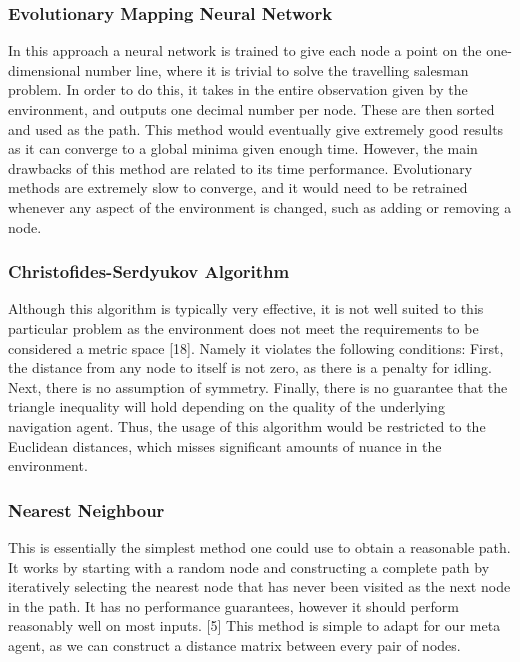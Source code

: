 \documentclass{article}
\begin{document}
	\subsubsection{Evolutionary Mapping Neural Network}
	\label{evol_nn}
	In this approach a neural network is trained to give each node a point on the one-dimensional number line, where it is trivial to solve the travelling salesman problem. In order to do this, it takes in the entire observation given by the environment, and outputs one decimal number per node. These are then sorted and used as the path. This method would eventually give extremely good results as it can converge to a global minima given enough time. However, the main drawbacks of this method are related to its time performance. Evolutionary methods are extremely slow to converge, and it would need to be retrained whenever any aspect of the environment is changed, such as adding or removing a node.
	
	\subsubsection{Christofides-Serdyukov Algorithm}
	Although this algorithm is typically very effective, it is not well suited to this particular problem as the environment does not meet the requirements to be considered a metric space [18]. Namely it violates the following conditions: First, the distance from any node to itself is not zero, as there is a penalty for idling. Next, there is no assumption of symmetry. Finally, there is no guarantee that the triangle inequality will hold depending on the quality of the underlying navigation agent. Thus, the usage of this algorithm would be restricted to the Euclidean distances, which misses significant amounts of nuance in the environment.
	
	\subsubsection{Nearest Neighbour}
	\label{nearest_neighbour}
	This is essentially the simplest method one could use to obtain a reasonable path. It works by starting with a random node and constructing a complete path by iteratively selecting the nearest node that has never been visited as the next node in the path. It has no performance guarantees, however it should perform reasonably well on most inputs. [5] This method is simple to adapt for our meta agent, as we can construct a distance matrix between every pair of nodes.
	
\end{document}
